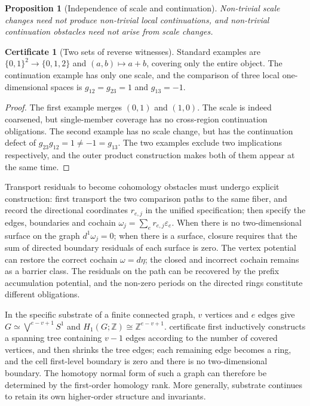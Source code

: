 \documentclass[11pt,a4paper]{article}
\theoremstyle{plain}
\newtheorem{proposition}[theorem]{Proposition}
\theoremstyle{definition}
\newtheorem*{certificate}{Certificate}
\theoremstyle{remark}
\begin{document}
\begin{CJK*}
\begin{proposition}
[Independence of scale and continuation]Non-trivial scale changes need not produce non-trivial local continuations, and non-trivial continuation obstacles need not arise from scale changes.\end{proposition}
\begin{certificate}
[Two sets of reverse witnesses]Standard examples are $\{0,1\}^2\to\{0,1,2\}$ and $(a,b)\mapsto a+b$, covering only the entire object. The continuation example has only one scale, and the comparison of three local one-dimensional spaces is $g_{12}=g_{23}=1$ and $g_{13}=-1$.\end{certificate}
\begin{proof}
The first example merges $(0,1)$ and $(1,0)$. The scale is indeed coarsened, but single-member coverage has no cross-region continuation obligations. The second example has no scale change, but has the continuation defect of $g_{23}g_{12}=1\ne-1=g_{13}$. The two examples exclude two implications respectively, and the outer product construction makes both of them appear at the same time.\end{proof}


Transport residuals to become cohomology obstacles must undergo explicit construction: first transport the two comparison paths to the same fiber, and record the directional coordinates $r_{e,j}$ in the unified specification; then specify the edges, boundaries and cochain $\omega_j=\sum_e r_{e,j}\varepsilon_e$. When there is no two-dimensional surface on the graph $d^1\omega_j=0$; when there is a surface, closure requires that the sum of directed boundary residuals of each surface is zero. The vertex potential can restore the correct cochain $\omega=d\eta$; the closed and incorrect cochain remains as a barrier class. The residuals on the path can be recovered by the prefix accumulation potential, and the non-zero periods on the directed rings constitute different obligations.

In the specific substrate of a finite connected graph, $v$ vertices and $e$ edges give $G\simeq\bigvee^{e-v+1}S^1$ and $H_1(G;\mathbb Z)\cong\mathbb Z^{e-v+1}$. certificate first inductively constructs a spanning tree containing $v-1$ edges according to the number of covered vertices, and then shrinks the tree edges; each remaining edge becomes a ring, and the cell first-level boundary is zero and there is no two-dimensional boundary. The homotopy normal form of such a graph can therefore be determined by the first-order homology rank. More generally, substrate continues to retain its own higher-order structure and invariants.


\end{CJK*}
\end{document}
